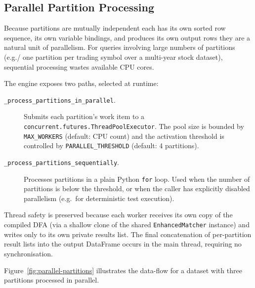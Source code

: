 \subsection{Parallel Partition Processing}
\label{subsec:bg-parallel}

Because partitions are mutually independent each has its own sorted row sequence, its own variable bindings, and produces its own output rows they are a natural unit of parallelism.  For queries involving large numbers of partitions (e.g./\/ one partition per trading symbol over a multi-year stock dataset), sequential processing wastes available CPU cores.

The engine exposes two paths, selected at runtime:
\begin{description}
  \item[\texttt{\_process\_partitions\_in\_parallel}.]
    Submits each partition's work item to a
    \texttt{concurrent.futures.ThreadPoolExecutor}.  The pool size
    is bounded by \texttt{MAX\_WORKERS} (default: CPU count) and
    the activation threshold is controlled by
    \texttt{PARALLEL\_THRESHOLD} (default: 4 partitions).

  \item[\texttt{\_process\_partitions\_sequentially}.]
    Processes partitions in a plain Python \texttt{for} loop.
    Used when the number of partitions is below the threshold, or
    when the caller has explicitly disabled parallelism (e.g.\
    for deterministic test execution).
\end{description}

Thread safety is preserved because each worker receives its own
copy of the compiled DFA (via a shallow clone of the shared
\texttt{EnhancedMatcher} instance) and writes only to its own
private results list.  The final concatenation of per-partition
result lists into the output DataFrame occurs in the main thread,
requiring no synchronisation.

Figure~\ref{fig:parallel-partitions} illustrates the data-flow
for a dataset with three partitions processed in parallel.

